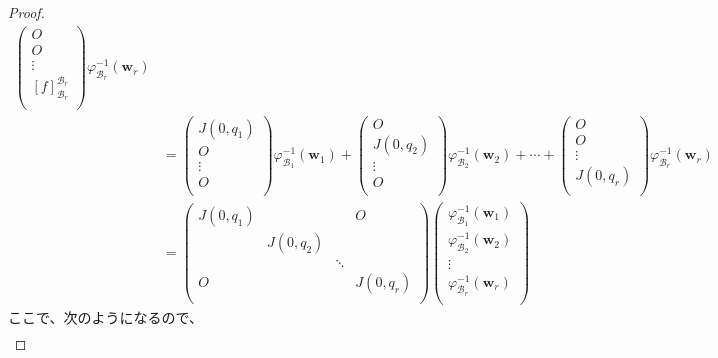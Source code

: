 \documentclass[dvipdfmx]{jsarticle}
\begin{document}
\begin{proof}
\begin{align*}
\begin{pmatrix}
O \\
O \\
 \vdots \\
[ f]_{\mathcal{B}_{r}}^{\mathcal{B}_{r}} \\
\end{pmatrix}\varphi_{\mathcal{B}_{r}}^{- 1}\left( \mathbf{w}_{r} \right)\\
&= \begin{pmatrix}
J\left( 0,q_{1} \right) \\
O \\
 \vdots \\
O \\
\end{pmatrix}\varphi_{\mathcal{B}_{1}}^{- 1}\left( \mathbf{w}_{1} \right) + \begin{pmatrix}
O \\
J\left( 0,q_{2} \right) \\
 \vdots \\
O \\
\end{pmatrix}\varphi_{\mathcal{B}_{2}}^{- 1}\left( \mathbf{w}_{2} \right) + \cdots + \begin{pmatrix}
O \\
O \\
 \vdots \\
J\left( 0,q_{r} \right) \\
\end{pmatrix}\varphi_{\mathcal{B}_{r}}^{- 1}\left( \mathbf{w}_{r} \right)\\
&= \begin{pmatrix}
J\left( 0,q_{1} \right) & \  & \  & O \\
\  & J\left( 0,q_{2} \right) & \  & \  \\
\  & \  & \ddots & \  \\
O & \  & \  & J\left( 0,q_{r} \right) \\
\end{pmatrix}\begin{pmatrix}
\varphi_{\mathcal{B}_{1}}^{- 1}\left( \mathbf{w}_{1} \right) \\
\varphi_{\mathcal{B}_{2}}^{- 1}\left( \mathbf{w}_{2} \right) \\
 \vdots \\
\varphi_{\mathcal{B}_{r}}^{- 1}\left( \mathbf{w}_{r} \right) \\
\end{pmatrix}
\end{align*}
ここで、次のようになるので、
\begin{align*}

\end{align*}
\end{proof}
\end{document}
